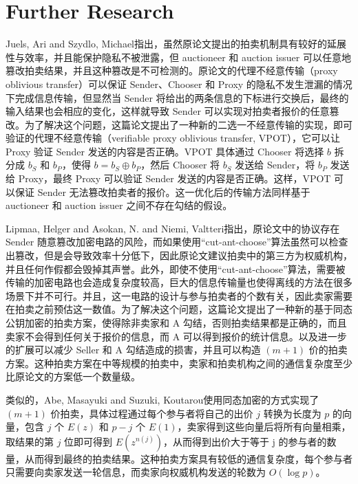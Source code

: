 \section{Further Research}

Juels, Ari and Szydlo, Michael\cite{Juels2002}指出，虽然原论文提出的拍卖机制具有较好的延展性与效率，并且能保护隐私不被泄露，但 auctioneer 和 auction issuer 可以任意地篡改拍卖结果，并且这种篡改是不可检测的。原论文的代理不经意传输（proxy oblivious transfer）可以保证 Sender、Chooser 和 Proxy 的隐私不发生泄漏的情况下完成信息传输，但显然当 Sender 将给出的两条信息的下标进行交换后，最终的输入结果也会相应的变化，这样就导致 Sender 可以实现对拍卖者报价的任意篡改。为了解决这个问题，这篇论文提出了一种新的二选一不经意传输的实现，即可验证的代理不经意传输（verifiable proxy oblivious transfer, VPOT），它可以让 Proxy 验证 Sender 发送的内容是否正确。VPOT 具体通过 Chooser 将选择 $b$ 拆分成 $b_S$ 和 $b_P$，使得 $b=b_S \oplus b_P$，然后 Chooser 将 $b_S$ 发送给 Sender，将 $b_P$ 发送给 Proxy，最终 Proxy 可以验证 Sender 发送的内容是否正确。这样，VPOT 可以保证 Sender 无法篡改拍卖者的报价。这一优化后的传输方法同样基于 auctioneer 和 auction issuer 之间不存在勾结的假设。

Lipmaa, Helger and Asokan, N. and Niemi, Valtteri\cite{Lipmaa2003}指出，原论文中的协议存在 Sender 随意篡改加密电路的风险，而如果使用“cut-ant-choose”算法虽然可以检查出篡改，但是会导致效率十分低下，因此原论文建议拍卖中的第三方为权威机构，并且任何作假都会毁掉其声誉。此外，即使不使用“cut-ant-choose”算法，需要被传输的加密电路也会造成复杂度较高，巨大的信息传输量也使得离线的方法在很多场景下并不可行。并且，这一电路的设计与参与拍卖者的个数有关，因此卖家需要在拍卖之前预估这一数值。为了解决这个问题，这篇论文提出了一种新的基于同态公钥加密的拍卖方案，使得除非卖家和 A 勾结，否则拍卖结果都是正确的，而且卖家不会得到任何关于报价的信息，而 A 可以得到报价的统计信息。以及进一步的扩展可以减少 Seller 和 A 勾结造成的损害，并且可以构造 $(m + 1)$ 价的拍卖方案。这种拍卖方案在中等规模的拍卖中，卖家和拍卖机构之间的通信复杂度至少比原论文的方案低一个数量级。

类似的，Abe, Masayuki and Suzuki, Koutarou\cite{Abe2002}使用同态加密的方式实现了 $(m + 1)$ 价拍卖，具体过程通过每个参与者将自己的出价 $j$ 转换为长度为 $p$ 的向量，包含 $j$ 个 $E(z)$ 和 $p-j$ 个 $E(1)$，卖家得到这些向量后将所有向量相乘，取结果的第 $j$ 位即可得到 $E(z^{n(j)})$，从而得到出价大于等于 j 的参与者的数量，从而得到最终的拍卖结果。这种拍卖方案具有较低的通信复杂度，每个参与者只需要向卖家发送一轮信息，而卖家向权威机构发送的轮数为 $O(\log p)$。

